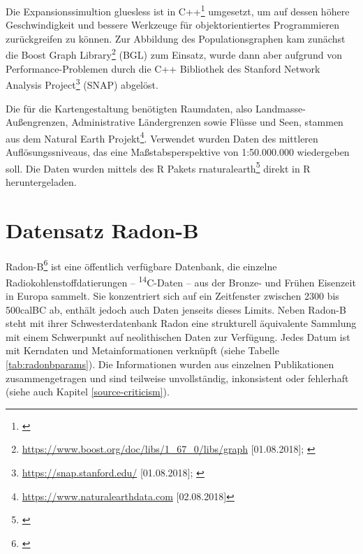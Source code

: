 \documentclass[openany,twoside,twocolumn]{book}
\let\rmarkdownfootnote\footnote%
\def\footnote{\protect\rmarkdownfootnote}
\begin{document}
Die Expansionssimultion gluesless ist in C++\footnote{\textcite{standard-cpp-foundation_international_2017}}
umgesetzt, um auf dessen höhere Geschwindigkeit und bessere Werkzeuge
für objektorientiertes Programmieren zurückgreifen zu können. Zur
Abbildung des Populationsgraphen kam zunächst die Boost Graph
Library\footnote{\url{https://www.boost.org/doc/libs/1_67_0/libs/graph}
  {[}01.08.2018{]}; \textcite{siek_boost_2002}} (BGL) zum Einsatz, wurde
dann aber aufgrund von Performance-Problemen durch die C++ Bibliothek
des Stanford Network Analysis Project\footnote{\url{https://snap.stanford.edu/}
  {[}01.08.2018{]}; \textcite{leskovec2016snap}} (SNAP) abgelöst.

Die für die Kartengestaltung benötigten Raumdaten, also
Landmasse-Außengrenzen, Administrative Ländergrenzen sowie Flüsse und
Seen, stammen aus dem Natural Earth Projekt\footnote{\url{https://www.naturalearthdata.com}
  {[}02.08.2018{]}}. Verwendet wurden Daten des mittleren
Auflösungssniveaus, das eine Maßstabsperspektive von 1:50.000.000
wiedergeben soll. Die Daten wurden mittels des R Pakets
rnaturalearth\footnote{\textcite{south_rnaturalearth_2017}} direkt in R
heruntergeladen.

\hypertarget{radonb-dataset}{%
\section{Datensatz Radon-B}\label{radonb-dataset}}

Radon-B\footnote{\textcite{kneisel_radon-b_2013}} ist eine öffentlich
verfügbare Datenbank, die einzelne Radiokohlenstoffdatierungen --
\textsuperscript{14}C-Daten -- aus der Bronze- und Frühen Eisenzeit in
Europa sammelt. Sie konzentriert sich auf ein Zeitfenster zwischen 2300
bis 500calBC ab, enthält jedoch auch Daten jenseits dieses Limits. Neben
Radon-B steht mit ihrer Schwesterdatenbank
Radon\autocite{martin_hinz_radon_2012} eine strukturell äquivalente
Sammlung mit einem Schwerpunkt auf neolithischen Daten zur Verfügung.
Jedes Datum ist mit Kerndaten und Metainformationen verknüpft (siehe
Tabelle \ref{tab:radonbparams}). Die Informationen wurden aus einzelnen
Publikationen zusammengetragen und sind teilweise unvollständig,
inkonsistent oder fehlerhaft (siehe auch Kapitel
\ref{source-criticism}).
\end{document}
